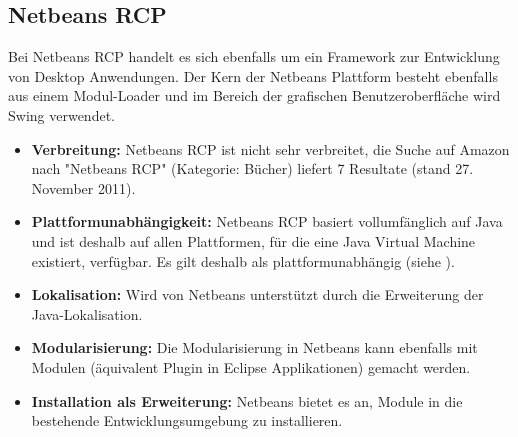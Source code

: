 \subsection{Netbeans RCP}
Bei Netbeans RCP handelt es sich ebenfalls um ein Framework zur Entwicklung von Desktop Anwendungen. Der Kern der Netbeans Plattform besteht ebenfalls aus einem Modul-Loader und im Bereich der grafischen Benutzeroberfläche wird Swing verwendet. 
\begin{itemize}
\item \textbf{Verbreitung:} Netbeans RCP ist nicht sehr verbreitet, die Suche auf Amazon nach "Netbeans RCP" (Kategorie: Bücher) liefert 7 Resultate (stand 27. November 2011).
\item \textbf{Plattformunabhängigkeit:} Netbeans RCP basiert vollumfänglich auf Java und ist deshalb auf allen Plattformen, für die eine Java Virtual Machine existiert, verfügbar. Es gilt deshalb als plattformunabhängig (siehe \cite{wiki:netbeans}).
\item \textbf{Lokalisation:} Wird von Netbeans unterstützt durch die Erweiterung der Java-Lokalisation.
\item \textbf{Modularisierung:} Die Modularisierung in Netbeans kann ebenfalls mit Modulen (äquivalent Plugin in Eclipse Applikationen) gemacht werden.
\item \textbf{Installation als Erweiterung:} Netbeans bietet es an, Module in die bestehende Entwicklungsumgebung zu installieren.
\end{itemize}

